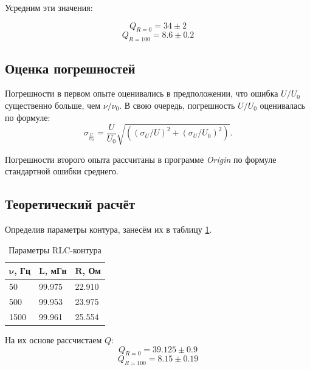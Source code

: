 \documentclass[10pt,a4paper]{article}
\begin{document}
Усредним эти значения:

\begin{equation}\label{key}
	Q_{R=0} = 34 \pm 2
\end{equation}
\begin{equation}\label{key}
	Q_{R=100} = 8.6 \pm 0.2
\end{equation}

\subsection{Оценка погрешностей}
Погрешности в первом опыте оценивались в предположении, что ошибка $U/U_0$ существенно больше, чем $\nu/\nu_0$. В свою очередь, погрешность $U/U_0$ оценивалась по формуле:
\begin{equation}\label{key}
	\sigma_{\frac{U}{U_0}}=\frac{U}{U_0} \sqrt{((\sigma_U/U)^2+(\sigma_U/U_0)^2)}.
\end{equation}

Погрешности второго опыта рассчитаны в программе \emph{Origin} по формуле стандартной ошибки среднего.

\subsection{Теоретический расчёт}

Определив параметры контура, занесём их в таблицу \ref{2}.

\begin{table}[h]
	\centering
	\begin{tabular}{|l|l|l|}
		\hline
		$\mathbf{\nu}${\bf,  Гц} & $\mathbf{L}${\bf, мГн} & $\mathbf{R}${\bf, Ом} \\ \hline
		50                       & 99.975                 & 22.910                \\ \hline
		500                      & 99.953                 & 23.975                \\ \hline
		1500                     & 99.961                 & 25.554                \\ \hline
	\end{tabular}
	\caption{Параметры RLC-контура}
	\label{2}
\end{table}

На их основе рассчистаем $Q$:
\begin{equation}\label{key}
	Q_{R=0} = 39.125 \pm 0.9
\end{equation}
\begin{equation}\label{key}
	Q_{R=100}=8.15 \pm 0.19
\end{equation}
	
\end{document}
